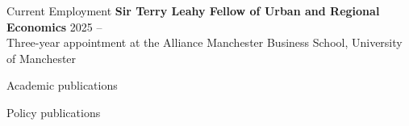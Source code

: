 \documentclass{resume}
\begin{document}
\begin{rSection}{Current Employment}
{\bf Sir Terry Leahy Fellow of Urban and Regional Economics} \hfill {2025 -- }\\
Three-year appointment at the Alliance Manchester Business School, University of Manchester
\end{rSection}

\begin{rSection}{Academic publications}
\begin{refsection}
\nocite{*}
\printbibliography[heading=none]
\end{refsection}
\end{rSection}


\begin{rSection}{Policy publications}
\begin{refsection}
\nocite{*}
\printbibliography[heading=none]
\end{refsection}
\end{rSection}
\end{document}
